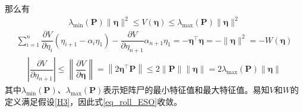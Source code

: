 那么有
\begin{align}\lambda_{\min }(\bm{P})\|\bm{\eta}\|^{2} \leq V(\bm{\eta}) \leq \lambda_{\max }(\bm{P})\|\bm{\eta}\|^{2}\end{align}
\begin{align}\sum_{i=1}^{n} \dfrac{\partial V}{\partial \eta_{i}}\left(\eta_{i+1}-\alpha_{i} \eta_{1}\right)-\dfrac{\partial V}{\partial \eta_{n+1}} \alpha_{n+1} \eta_{1}=-\bm{\eta}^{\top} \bm{\eta}=-\|\bm{\eta}\|^{2}=-W(\bm{\eta})\end{align}
\begin{align}\left|\dfrac{\partial V}{\partial \eta_{n+1}}\right| \leq\left\|\dfrac{\partial V}{\partial \bm{\eta}}\right\|=\left\|2 \bm{\eta}^{\top} \bm{P}\right\| \leq 2\|\bm{P}\|\|\bm{\eta}\|=2 \lambda_{\max }(\bm{P})\|\bm{\eta}\|\end{align}
其中$ \lambda_{\min }(\bm{P}) $、$ \lambda_{\max }(\bm{P}) $表示矩阵尸的最小特征值和最大特征值。易知$ V $和$ W $的定义满足假设\ref{H3}，因此式\eqref{eq_roll_ESO}收敛。
